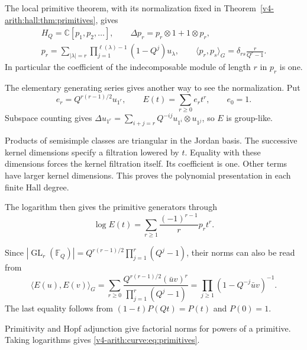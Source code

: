 The local primitive theorem, with its normalization fixed in
Theorem~\ref{v4-arith:hall:thm:primitives}, gives
\begin{equation}\label{v4-arith:curve:eq:primitives}
 \begin{gathered}
 H_Q=\mathbb C[p_1,p_2,\ldots],\qquad
 \Delta p_r=p_r\otimes1+1\otimes p_r,\\
 p_r=\sum_{|\lambda|=r}
       \prod_{j=1}^{\ell(\lambda)-1}(1-Q^j)u_\lambda,
 \qquad
 \langle p_r,p_s\rangle_G=\delta_{rs}\frac r{Q^r-1}.
 \end{gathered}
\end{equation}
In particular the coefficient of the indecomposable module of
length $r$ in $p_r$ is one.

The elementary generating series gives another way to see the
normalization. Put
\[
 e_r=Q^{r(r-1)/2}u_{1^r},\qquad
 E(t)=\sum_{r\geq0}e_rt^r,
 \qquad e_0=1.
\]
Subspace counting gives
$\Delta u_{1^r}=\sum_{i+j=r}Q^{-ij}u_{1^i}\otimes u_{1^j}$,
so $E$ is group-like.

Products of semisimple classes are triangular in the Jordan basis.
The successive kernel dimensions specify a filtration lowered by $t$.
Equality with these dimensions forces the kernel filtration itself. Its coefficient is
one. Other terms have larger kernel dimensions. This proves the
polynomial presentation in each finite Hall degree.

The logarithm
then gives the primitive generators through
\[
 \log E(t)=\sum_{r\geq1}\frac{(-1)^{r-1}}r p_rt^r.
\]

Since
$|\operatorname{GL}_r(\mathbb F_Q)|
=Q^{r(r-1)/2}\prod_{j=1}^r(Q^j-1)$, their norms can also be read from
\[
 \langle E(u),E(v)\rangle_G
 =\sum_{r\geq0}\frac{Q^{r(r-1)/2}(\bar uv)^r}
                         {\prod_{j=1}^r(Q^j-1)}
 =\prod_{j\geq1}(1-Q^{-j}\bar uv)^{-1}.
\]
The last equality follows from $(1-t)P(Qt)=P(t)$ and $P(0)=1$.

Primitivity and Hopf adjunction give factorial norms for powers
of a primitive. Taking logarithms gives
\eqref{v4-arith:curve:eq:primitives}.

